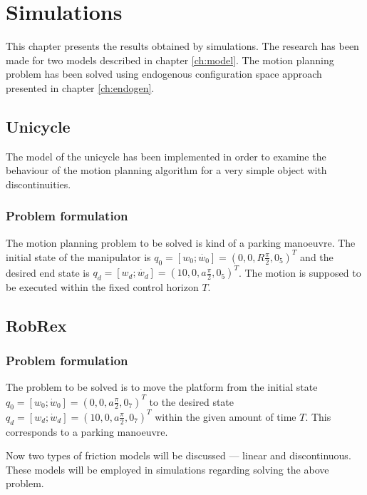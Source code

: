 \chapter{Simulations}
This chapter presents the results obtained by simulations. The research has been made for two models
described in chapter \ref{ch:model}. The motion planning problem has been solved using endogenous
configuration space approach presented in chapter \ref{ch:endogen}.

\section{Unicycle}
The model of the unicycle has been implemented in order to examine the behaviour
of the motion planning algorithm for a very simple object with discontinuities. 

\subsection{Problem formulation}
The motion planning problem to be solved is kind of a parking manoeuvre. The initial
state of the manipulator is $q_0 = [w_0; \dot{w_0}] = (0, 0, R\frac{\pi}{2}, 0_5)^T$
and the desired end state is $q_d = [w_d; \dot{w_d}] = (10, 0, a\frac{\pi}{2}, 0_5)^T$.
The motion is supposed to be executed within the fixed control horizon $T$.

\section{RobRex}
\subsection{Problem formulation}
\label{sec:rex_task}
The problem to be solved is to move the platform from the initial state
$q_0 = [w_0; \dot{w}_0] = (0, 0, a\frac{\pi}{2}, 0_7)^T$ to the desired state
$q_d = [w_d; \dot{w}_d] = (10, 0, a\frac{\pi}{2}, 0_7)^T$
within the given amount of time $T$. 
This corresponds to a parking manoeuvre.

Now two types of friction models will be discussed --- linear
and discontinuous. These models will be employed in simulations
regarding solving the above problem.

